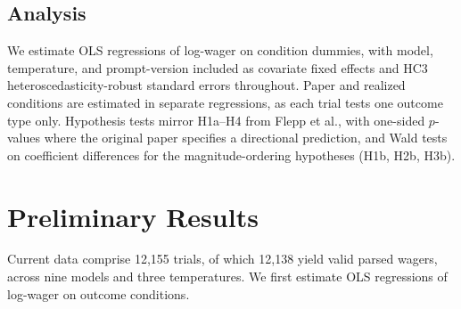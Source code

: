 \documentclass[midterm]{sparreport}
\begin{document}
\subsection{Analysis}

We estimate OLS regressions of log-wager on condition dummies, with model,
temperature, and prompt-version included as covariate fixed effects and HC3
heteroscedasticity-robust standard errors throughout. Paper and realized conditions
are estimated in separate regressions, as each trial tests one outcome type only.
Hypothesis tests mirror H1a--H4 from Flepp et al., with one-sided $p$-values
where the original paper specifies a directional prediction, and Wald tests on
coefficient differences for the magnitude-ordering hypotheses (H1b, H2b, H3b).

\section{Preliminary Results}

Current data comprise 12,155 trials, of which 12,138 yield valid parsed wagers,
across nine models and three temperatures. We first estimate OLS regressions of
log-wager on outcome conditions.
\end{document}
